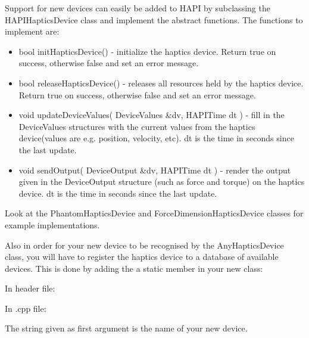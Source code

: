 Support for new devices can easily be added to HAPI by subclassing the
HAPIHapticsDevice class and implement the abstract functions. The
functions to implement are:

\begin{itemize}
\item bool initHapticsDevice() - initialize the haptics device. Return
  true on success, otherwise false and set an error message. 
\item bool releaseHapticsDevice() - releases all resources held by the
  haptics device. Return true on success, otherwise false and set an
  error message. 
\item void updateDeviceValues( DeviceValues \&dv, HAPITime dt ) - fill
  in the DeviceValues structures with the current values from the
  haptics device(values are e.g. position, velocity, etc). dt is the
  time in seconds since the last update.
\item void sendOutput( DeviceOutput \&dv, HAPITime dt ) - render the
  output given in the DeviceOutput structure (such as force and torque)
  on the haptics device. dt is the time in seconds since the last update.
\end{itemize}

Look at the PhantomHapticsDevice and ForceDimensionHapticsDevice classes for
example implementations. 

Also in order for your new device to be recognised by the
AnyHapticsDevice class, you will have to register the haptics device
to a database of available devices. This is done by adding the a
static member in your new class:

In header file:



In .cpp file:



The string given as first argument is the name of your new device.

